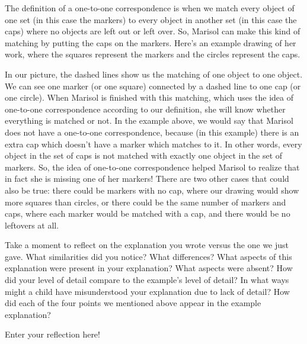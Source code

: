 \documentclass[noauthor,nooutcomes]{ximera}
\begin{document}
\begin{problem}
\begin{problem}
\begin{explanation}
The definition of a one-to-one correspondence is when we match every object of one set (in this case the markers) to every object in another set (in this case the caps) where no objects are left out or left over. So, Marisol can make this kind of matching by putting the caps on the markers. Here's an example drawing of her work, where the squares represent the markers and the circles represent the caps.
\begin{center}
\end{center}
In our picture, the dashed lines show us the matching of one object to one object. We can see one marker (or one square) connected by a dashed line to one cap (or one circle). When Marisol is finished with this matching, which uses the idea of one-to-one correspondence according to our definition, she will know whether everything is matched or not. In the example above, we would say that Marisol does not have a one-to-one correspondence, because (in this example) there is an extra cap which doesn't have a marker which matches to it. In other words, every object in the set of caps is not matched with exactly one object in the set of markers. So, the idea of one-to-one correspondence helped Marisol to realize that in fact she is missing one of her markers! There are two other cases that could also be true: there could be markers with no cap, where our drawing would show more squares than circles, or there could be the same number of markers and caps, where each marker would be matched with a cap, and there would be no leftovers at all.
\end{explanation}

Take a moment to reflect on the explanation you wrote versus the one we just gave. What similarities did you notice? What differences? What aspects of this explanation were present in your explanation? What aspects were absent? How did your level of detail compare to the example's level of detail? In what ways might a child have misunderstood your explanation due to lack of detail? How did each of the four points we mentioned above appear in the example explanation?
\begin{freeResponse}
	Enter your reflection here!
\end{freeResponse}
\end{problem}
\end{problem}
\end{document}
